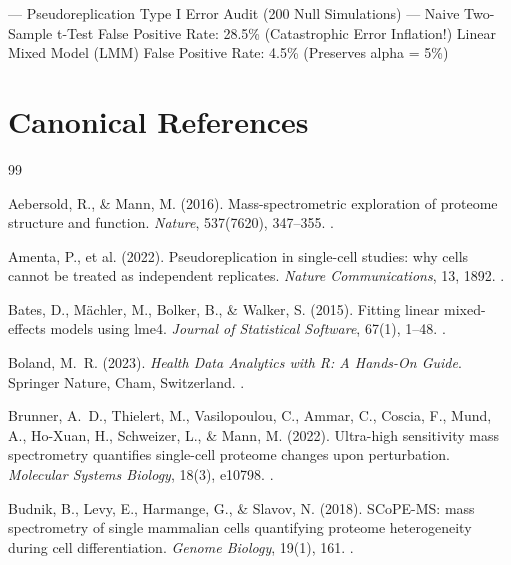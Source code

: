 \documentclass[11pt,twoside,openright]{book}
\begin{document}
\begin{routput}
--- Pseudoreplication Type I Error Audit (200 Null Simulations) ---
Naive Two-Sample t-Test False Positive Rate: 28.5\% (Catastrophic Error Inflation!)
Linear Mixed Model (LMM) False Positive Rate:   4.5\% (Preserves alpha = 5\%)
\end{routput}

\section*{Canonical References}

\begin{thebibliography}{99}

Aebersold, R., \& Mann, M. (2016). Mass-spectrometric exploration of proteome structure and function. \textit{Nature}, 537(7620), 347--355. .

Amenta, P., et al. (2022). Pseudoreplication in single-cell studies: why cells cannot be treated as independent replicates. \textit{Nature Communications}, 13, 1892. .

Bates, D., M\"achler, M., Bolker, B., \& Walker, S. (2015). Fitting linear mixed-effects models using lme4. \textit{Journal of Statistical Software}, 67(1), 1--48. .

Boland, M.~R. (2023). \textit{Health Data Analytics with R: A Hands-On Guide}. Springer Nature, Cham, Switzerland. .

Brunner, A.~D., Thielert, M., Vasilopoulou, C., Ammar, C., Coscia, F., Mund, A., Ho-Xuan, H., Schweizer, L., \& Mann, M. (2022). Ultra-high sensitivity mass spectrometry quantifies single-cell proteome changes upon perturbation. \textit{Molecular Systems Biology}, 18(3), e10798. .

Budnik, B., Levy, E., Harmange, G., \& Slavov, N. (2018). SCoPE-MS: mass spectrometry of single mammalian cells quantifying proteome heterogeneity during cell differentiation. \textit{Genome Biology}, 19(1), 161. .


\end{thebibliography}
\end{document}
